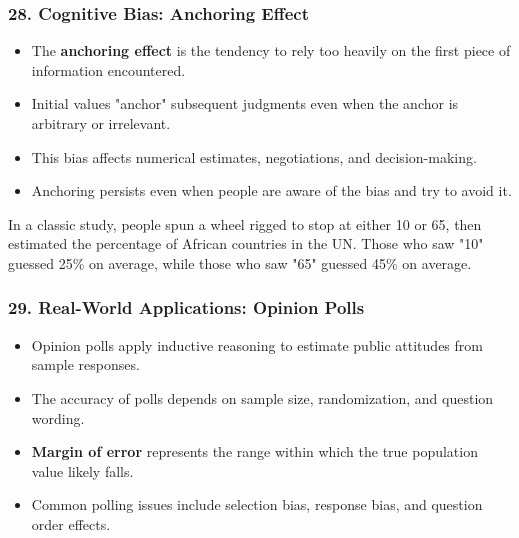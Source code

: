 \documentclass{beamer}
\begin{document}
\begin{frame}
\frametitle{28. Cognitive Bias: Anchoring Effect}
\begin{itemize}
\item The \textbf{anchoring effect} is the tendency to rely too heavily on the first piece of information encountered.
\item Initial values "anchor" subsequent judgments even when the anchor is arbitrary or irrelevant.
\item This bias affects numerical estimates, negotiations, and decision-making.
\item Anchoring persists even when people are aware of the bias and try to avoid it.
\end{itemize}

\begin{example}
In a classic study, people spun a wheel rigged to stop at either 10 or 65, then estimated the percentage of African countries in the UN. Those who saw "10" guessed 25\% on average, while those who saw "65" guessed 45\% on average.
\end{example}
\end{frame}

\begin{frame}
\frametitle{29. Real-World Applications: Opinion Polls}
\begin{itemize}
\item Opinion polls apply inductive reasoning to estimate public attitudes from sample responses.
\item The accuracy of polls depends on sample size, randomization, and question wording.
\item \textbf{Margin of error} represents the range within which the true population value likely falls.
\item Common polling issues include selection bias, response bias, and question order effects.
\end{itemize}

\end{frame}
\end{document}
